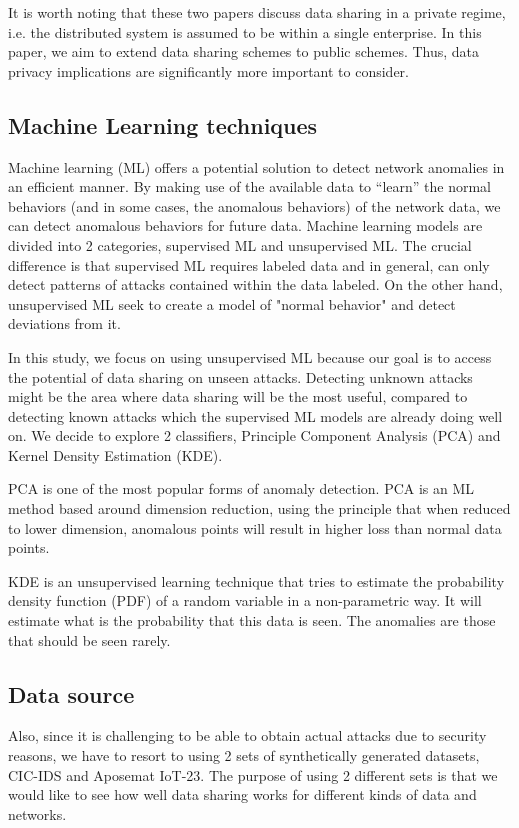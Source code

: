 \begin{background}
It is worth noting that these two papers discuss data sharing in a private regime, i.e. the distributed system is assumed to be within a single enterprise. In this paper, we aim to extend data sharing schemes to public schemes. Thus, data privacy implications are significantly more important to consider.

\subsection{Machine Learning techniques}
Machine learning (ML) offers a potential solution to detect network anomalies in an efficient manner. By making use of the available data to ``learn'' the normal behaviors (and in some cases, the anomalous behaviors) of the network data, we can detect anomalous behaviors for future data. 
Machine learning models are divided into 2 categories, supervised ML and unsupervised ML. The crucial difference is that supervised ML requires labeled data and in general, can only detect patterns of attacks contained within the data labeled. On the other hand, unsupervised ML seek to create a model of "normal behavior" and detect deviations from it.

In this study, we focus on using unsupervised ML because our goal is to access the potential of data sharing on unseen attacks. Detecting unknown attacks might be the area where data sharing will be the most useful, compared to detecting known attacks which the supervised ML models are already doing well on. We decide to explore 2 classifiers, Principle Component Analysis (PCA) and Kernel Density Estimation (KDE). 

PCA is one of the most popular forms of anomaly detection. PCA is an ML method based around dimension reduction, using the principle that when reduced to lower dimension, anomalous points will result in higher loss than normal data points.

KDE is an unsupervised learning technique that tries to estimate the probability density function (PDF) of a random variable in a non-parametric way. It will estimate what is the probability that this data is seen. The anomalies are those that should be seen rarely.

\subsection{Data source}

Also, since it is challenging to be able to obtain actual attacks due to security reasons, we have to resort to using 2 sets of synthetically generated datasets, CIC-IDS and Aposemat IoT-23. The purpose of using 2 different sets is that we would like to see how well data sharing works for different kinds of data and networks.  


\end{background}
